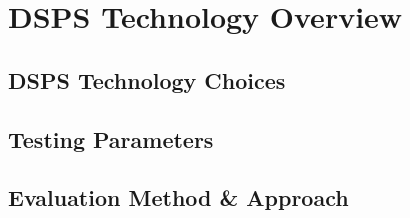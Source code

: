 \section{DSPS Technology Overview}
\label{sec:overview}

\subsection{DSPS Technology Choices} %
\label{sub:dsps_technology_choices}



\subsection{Testing Parameters} %
\label{sub:testing_parameters}



\subsection{Evaluation Method \& Approach} %
\label{sub:evaluation_method_approach}

